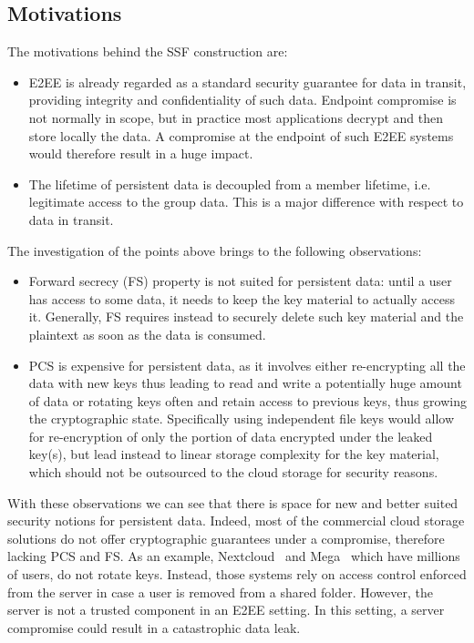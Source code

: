 \subsection{Motivations}

The motivations behind the SSF construction are:
\begin{itemize}
    \item E2EE is already regarded as a standard security guarantee for data in transit, providing integrity and confidentiality of such data. Endpoint compromise is not normally in scope, but in practice most applications decrypt and then store locally the data. A compromise at the endpoint of such E2EE systems would therefore result in a huge impact.
    \item The lifetime of persistent data is decoupled from a member lifetime, i.e. legitimate access to the group data. This is a major difference with respect to data in transit.
\end{itemize}

The investigation of the points above brings to the following
observations:
\begin{itemize}
    \item Forward secrecy (FS) property is not suited for 
    persistent data: until a user has access to some data, 
    it needs to keep the key material to actually access it. 
    Generally, FS requires instead to securely delete such key
    material and the plaintext as soon as the data is consumed. 
    \item PCS is expensive for persistent data, as it
    involves either re-encrypting all the data with new keys thus leading 
    to read and write a potentially huge amount of data or 
    rotating keys often and retain access to previous keys, 
    thus growing the cryptographic state. 
    Specifically using independent file keys would allow for 
    re-encryption of only the portion of data encrypted under 
    the leaked key(s), but lead instead to linear storage 
    complexity for the key material, which should not be 
    outsourced to the cloud storage for security reasons.
\end{itemize}

With these observations we can see that there is space for
new and better suited security notions for persistent data.
Indeed, most of the commercial cloud storage solutions do not offer cryptographic guarantees under a compromise,
therefore lacking PCS and FS. As an example, Nextcloud~\cite{2017NextcloudE2EEnc} and Mega~\cite{Mega}
which have millions of users, do not rotate keys. 
Instead, those systems rely on access control enforced from the server
in case a user is removed from a shared folder.
However, the server is not a trusted component in an E2EE setting.
In this setting, a server compromise could result in a catastrophic data leak.

